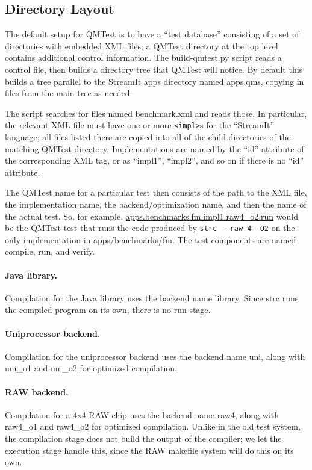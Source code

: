 \documentclass[11pt]{article}
\begin{document}
\subsection{Directory Layout}

The default setup for QMTest is to have a ``test
database'' consisting of a set of directories with embedded XML files;
a \textsf{QMTest} directory at the top level contains additional
control information.  The \textsf{build-qmtest.py} script reads a
control file, then builds a directory tree that QMTest will notice.
By default this builds a tree parallel to the StreamIt \textsf{apps}
directory named \textsf{apps.qms}, copying in files from the main tree
as needed.

The script searches for files named \textsf{benchmark.xml} and reads
those.  In particular, the relevant XML file must have one or more
\verb|<impl>|s for the ``StreamIt'' language; all files listed there
are copied into all of the child directories of the matching QMTest
directory.  Implementations are named by the ``id'' attribute of the
corresponding XML tag, or as ``impl1'', ``impl2'', and so on if there is 
no ``id'' attribute.

The QMTest name for a particular test then consists of the path to the
XML file, the implementation name, the backend/optimization name, and
then the name of the actual test.  So, for example,
\url{apps.benchmarks.fm.impl1.raw4\_o2.run} would be the QMTest test
that runs the code produced by \texttt{strc -{}-raw 4 -O2} on the only
implementation in \textsf{apps/benchmarks/fm}.  The test components
are named \textsf{compile}, \textsf{run}, and \textsf{verify}.

\paragraph{Java library.}  Compilation for the Java library uses the
backend name \textsf{library}.  Since \textsf{strc} runs the compiled
program on its own, there is no \textsf{run} stage.

\paragraph{Uniprocessor backend.}  Compilation for the uniprocessor
backend uses the backend name \textsf{uni}, along with
\textsf{uni\_o1} and \textsf{uni\_o2} for optimized compilation.

\paragraph{RAW backend.}  Compilation for a 4x4 RAW chip uses the
backend name \textsf{raw4}, along with \textsf{raw4\_o1} and
\textsf{raw4\_o2} for optimized compilation.  Unlike in the old test
system, the compilation stage does not build the output of the
compiler; we let the execution stage handle this, since the RAW
makefile system will do this on its own.
\end{document}
